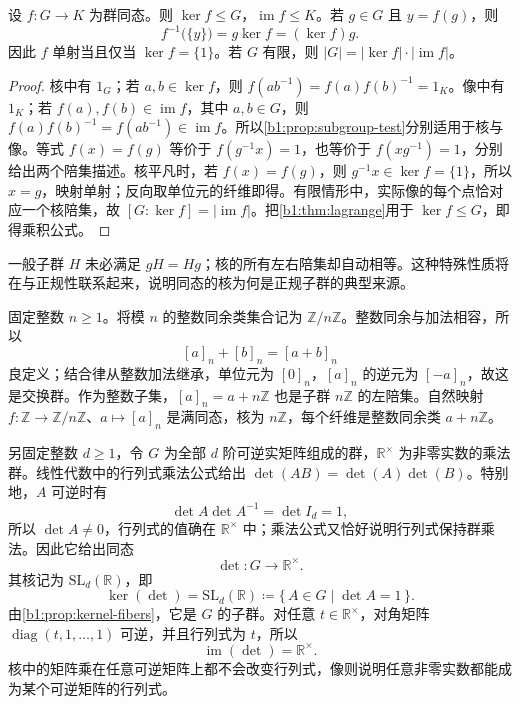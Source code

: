 \begin{proposition}\label{b1:prop:kernel-fibers}
	设 \(f:G\rightarrow K\) 为群同态。则 \(\ker f\leq G\)，\(\operatorname{im}f\leq K\)。若 \(g\in G\) 且 \(y=f(g)\)，则
	\[
		f^{-1}\bigl(\{y\}\bigr)=g\ker f=(\ker f)g.
	\]
	因此 \(f\) 单射当且仅当 \(\ker f=\{1\}\)。若 \(G\) 有限，则 \(\lvert G\rvert=\lvert\ker f\rvert\cdot\lvert\operatorname{im}f\rvert\)。
\end{proposition}

\begin{proof}
	核中有 \(1_G\)；若 \(a,b\in\ker f\)，则 \(f(ab^{-1})=f(a)f(b)^{-1}=1_K\)。像中有 \(1_K\)；若 \(f(a),f(b)\in\operatorname{im}f\)，其中 \(a,b\in G\)，则 \(f(a)f(b)^{-1}=f(ab^{-1})\in\operatorname{im}f\)。所以\cref{b1:prop:subgroup-test}分别适用于核与像。等式 \(f(x)=f(g)\) 等价于 \(f(g^{-1}x)=1\)，也等价于 \(f(xg^{-1})=1\)，分别给出两个陪集描述。核平凡时，若 \(f(x)=f(g)\)，则 \(g^{-1}x\in\ker f=\{1\}\)，所以 \(x=g\)，映射单射；反向取单位元的纤维即得。有限情形中，实际像的每个点恰对应一个核陪集，故 \([G:\ker f]=\lvert\operatorname{im}f\rvert\)。把\cref{b1:thm:lagrange}用于 \(\ker f\leq G\)，即得乘积公式。
\end{proof}

一般子群 \(H\) 未必满足 \(gH=Hg\)；核的所有左右陪集却自动相等。这种特殊性质将在与正规性联系起来，说明同态的核为何是正规子群的典型来源。

\ProseParagraphBreak
固定整数 \(n\geq1\)。将模 \(n\) 的整数同余类集合记为 \(\mathbb Z/n\mathbb Z\)。整数同余与加法相容，所以
\[
	[a]_n+[b]_n=[a+b]_n
\]
良定义；结合律从整数加法继承，单位元为 \([0]_n\)，\([a]_n\) 的逆元为 \([-a]_n\)，故这是交换群。作为整数子集，\([a]_n=a+n\mathbb Z\) 也是子群 \(n\mathbb Z\) 的左陪集。自然映射 \(f:\mathbb Z\rightarrow\mathbb Z/n\mathbb Z\)、\(a\mapsto[a]_n\) 是满同态，核为 \(n\mathbb Z\)，每个纤维是整数同余类 \(a+n\mathbb Z\)。

\ProseParagraphBreak
另固定整数 \(d\geq1\)，令 \(G\) 为全部 \(d\) 阶可逆实矩阵组成的群，\(\mathbb R^\times\) 为非零实数的乘法群。线性代数中的行列式乘法公式给出 \(\det(AB)=\det(A)\det(B)\)。特别地，\(A\) 可逆时有
\[
	\det A\det A^{-1}=\det I_d=1,
\]
所以 \(\det A\ne0\)，行列式的值确在 \(\mathbb R^\times\) 中；乘法公式又恰好说明行列式保持群乘法。因此它给出同态
\[
	\det:G\longrightarrow\mathbb R^\times.
\]
其核记为 \(\mathrm{SL}_d(\mathbb R)\)，即
\[
	\ker(\det)=\mathrm{SL}_d(\mathbb R) \coloneqq\{\,A\in G\mid\det A=1\,\}.
\]
由\cref{b1:prop:kernel-fibers}，它是 \(G\) 的子群。对任意 \(t\in\mathbb R^\times\)，对角矩阵 \(\operatorname{diag}(t,1,\ldots,1)\) 可逆，并且行列式为 \(t\)，所以
\[
	\operatorname{im}(\det)=\mathbb R^\times.
\]
核中的矩阵乘在任意可逆矩阵上都不会改变行列式，像则说明任意非零实数都能成为某个可逆矩阵的行列式。
